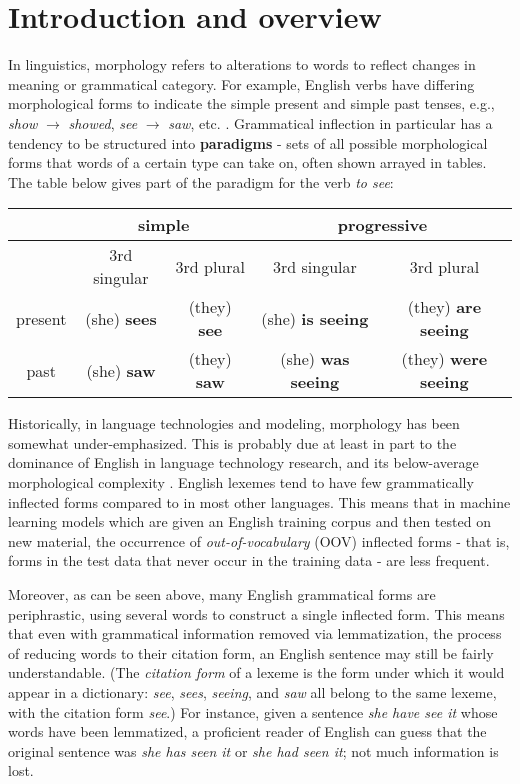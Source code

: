 \chapter{Introduction and overview}
\label{introduction}

In linguistics, morphology refers to alterations to words to reflect changes in meaning or grammatical category. For example, English verbs have differing morphological forms to indicate the simple present and simple past tenses, e.g., \textit{show} $\rightarrow$ \textit{showed}, \textit{see} $\rightarrow$ \textit{saw}, etc. \parencite{Dreyer2008}. Grammatical inflection in particular has a tendency to be structured into \textbf{paradigms} - sets of all possible morphological forms that words of a certain type can take on, often shown arrayed in tables. The table below gives part of the paradigm for the verb \textit{to see}:

\begin{tabular}{|c||c|c|c|c|}
\hline
& \multicolumn{2}{c|}{simple} & \multicolumn{2}{c|}{progressive} \\
\hline
& 3rd singular & 3rd plural & 3rd singular & 3rd plural \\
\hline \hline
present & (she) \textbf{sees} & (they) \textbf{see} & (she) \textbf{is seeing} & (they) \textbf{are seeing} \\
\hline 
past & (she) \textbf{saw} & (they) \textbf{saw} & (she) \textbf{was seeing} & (they) \textbf{were seeing} \\
\hline
\end{tabular}

Historically, in language technologies and modeling, morphology has been somewhat under-emphasized. This is probably due at least in part to the dominance of English in language technology research, and its below-average morphological complexity \parencite{Cotterell2017a}. English lexemes tend to have few grammatically inflected forms compared to in most other languages. This means that in machine learning models which are given an English training corpus and then tested on new material, the occurrence of \textit{out-of-vocabulary} (OOV) inflected forms - that is, forms in the test data that never occur in the training data - are less frequent. 

Moreover, as can be seen above, many English grammatical forms are periphrastic, using several words to construct a single inflected form. This means that even with grammatical information removed via lemmatization, the process of reducing words to their citation form, an English sentence may still be fairly understandable. (The \textit{citation form} of a lexeme is the form under which it would appear in a dictionary: \textit{see}, \textit{sees}, \textit{seeing}, and \textit{saw} all belong to the same lexeme, with the citation form \textit{see}.) For instance, given a sentence \textit{she have see it} whose words have been lemmatized, a proficient reader of English can guess that the original sentence was \textit{she has seen it} or \textit{she had seen it}; not much information is lost.

